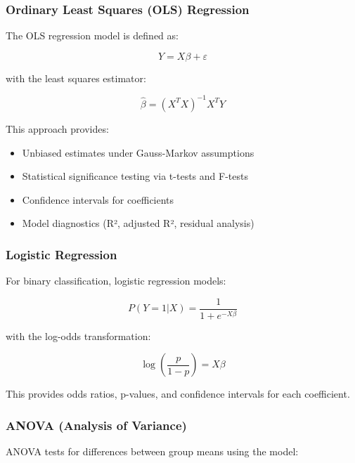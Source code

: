 \documentclass[11pt,a4paper]{article}
\begin{document}
\subsubsection{Ordinary Least Squares (OLS) Regression}

The OLS regression model is defined as:

\begin{equation}
Y = X\beta + \varepsilon
\end{equation}

with the least squares estimator:

\begin{equation}
\hat{\beta} = (X^T X)^{-1} X^T Y
\end{equation}

This approach provides:
\begin{itemize}
    \item Unbiased estimates under Gauss-Markov assumptions
    \item Statistical significance testing via t-tests and F-tests
    \item Confidence intervals for coefficients
    \item Model diagnostics (R², adjusted R², residual analysis)
\end{itemize}

\subsubsection{Logistic Regression}

For binary classification, logistic regression models:

\begin{equation}
P(Y=1|X) = \frac{1}{1 + e^{-X\beta}}
\end{equation}

with the log-odds transformation:

\begin{equation}
\log\left(\frac{p}{1-p}\right) = X\beta
\end{equation}

This provides odds ratios, p-values, and confidence intervals for each coefficient.

\subsubsection{ANOVA (Analysis of Variance)}

ANOVA tests for differences between group means using the model:
\end{document}
